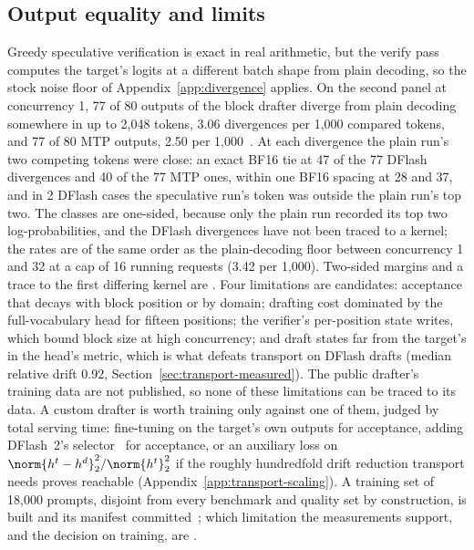 \subsection{Output equality and limits}\label{app:drafter-limits}\label{sec:drafter-limits}
Greedy speculative verification is exact in real arithmetic, but the verify pass computes the target's logits at a different batch shape from plain decoding, so the stock noise floor of Appendix~\ref{app:divergence} applies. On the second panel at concurrency 1, 77 of 80 outputs of the block drafter diverge from plain decoding somewhere in up to 2,048 tokens, 3.06 divergences per 1,000 compared tokens, and 77 of 80 MTP outputs, 2.50 per 1,000~. At each divergence the plain run's two competing tokens were close: an exact BF16 tie at 47 of the 77 DFlash divergences and 40 of the 77 MTP ones, within one BF16 spacing at 28 and 37, and in 2 DFlash cases the speculative run's token was outside the plain run's top two. The classes are one-sided, because only the plain run recorded its top two log-probabilities, and the DFlash divergences have not been traced to a kernel; the rates are of the same order as the plain-decoding floor between concurrency 1 and 32 at a cap of 16 running requests (3.42 per 1,000). Two-sided margins and a trace to the first differing kernel are . Four limitations are candidates: acceptance that decays with block position or by domain; drafting cost dominated by the full-vocabulary head for fifteen positions; the verifier's per-position state writes, which bound block size at high concurrency; and draft states far from the target's in the head's metric, which is what defeats transport on DFlash drafts (median relative drift 0.92, Section~\ref{sec:transport-measured}). The public drafter's training data are not published, so none of these limitations can be traced to its data. A custom drafter is worth training only against one of them, judged by total serving time: fine-tuning on the target's own outputs for acceptance, adding DFlash~2's selector~\cite{dflash,dflashcard} for acceptance, or an auxiliary loss on $\norm{h^t-h^d}_2^2/\norm{h^t}_2^2$ if the roughly hundredfold drift reduction transport needs proves reachable (Appendix~\ref{app:transport-scaling}). A training set of 18,000 prompts, disjoint from every benchmark and quality set by construction, is built and its manifest committed~; which limitation the measurements support, and the decision on training, are .

